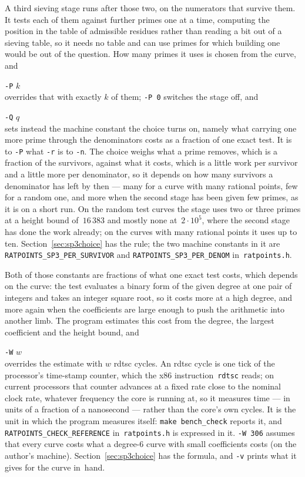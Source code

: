 \documentclass[12pt,a4paper,oneside]{amsart}
\begin{document}
A third sieving stage runs after those two, on the numerators that survive
them. It tests each of them against further primes one at a time, computing
the position in the table of admissible residues rather than reading a bit
out of a sieving table, so it needs no table and can use primes for which
building one would be out of the question. How many primes it uses is
chosen from the curve, and \\
\strut\quad\verb+-P+ $k$ \\
overrides that with exactly $k$ of them; \verb+-P 0+ switches the stage off,
and \\
\strut\quad\verb+-Q+ $q$ \\
sets instead the machine constant the choice turns on, namely what carrying
one more prime through the denominators costs as a fraction of one exact
test. It is to \verb+-P+ what \verb+-r+ is to \verb+-n+.
The choice weighs what a prime removes, which is a fraction of the survivors,
against what it costs, which is a little work per survivor and a little more
per denominator, so it depends on how many survivors a denominator has left
by then --- many for a curve with many rational points, few for a random one,
and more when the second stage has been given few primes, as it is on a
short run. On the random test curves the stage uses two or three primes at a
height bound of~$16\,383$ and mostly none at~$2\cdot10^5$, where the second
stage has done the work already; on the curves with many rational points it
uses up to ten. Section~\ref{sec:sp3choice} has the rule; the two machine constants in it
are \texttt{RATPOINTS\_SP3\_PER\_SURVIVOR} and
\texttt{RATPOINTS\_SP3\_PER\_DENOM} in~\texttt{ratpoints.h}.

Both of those constants are fractions of what one exact test costs, which
depends on the curve: the test evaluates a binary form of
the given degree at one pair of integers and takes an integer square root, so
it costs more at a high degree, and more again when the coefficients are
large enough to push the arithmetic into another limb. The program estimates
this cost from the degree, the largest coefficient and the height bound, and \\
\strut\quad\verb+-W+ $w$ \\
overrides the estimate with $w$ rdtsc cycles. An rdtsc cycle is one tick of
the processor's time-stamp counter, which the x86 instruction~\texttt{rdtsc}
reads; on current processors that counter advances at a fixed rate close to
the nominal clock rate, whatever frequency the core is running at, so it
measures time --- in units of a fraction of a nanosecond --- rather than the
core's own cycles. It is the unit in which the program measures itself:
\texttt{make bench\_check} reports it, and
\texttt{RATPOINTS\_CHECK\_REFERENCE} in~\texttt{ratpoints.h} is expressed
in it. \verb+-W 306+ assumes that every curve costs what a degree-6 curve
with small coefficients costs (on the author's machine).
Section~\ref{sec:sp3choice} has the formula, and \verb+-v+ prints
what it gives for the curve in~hand.
\end{document}
